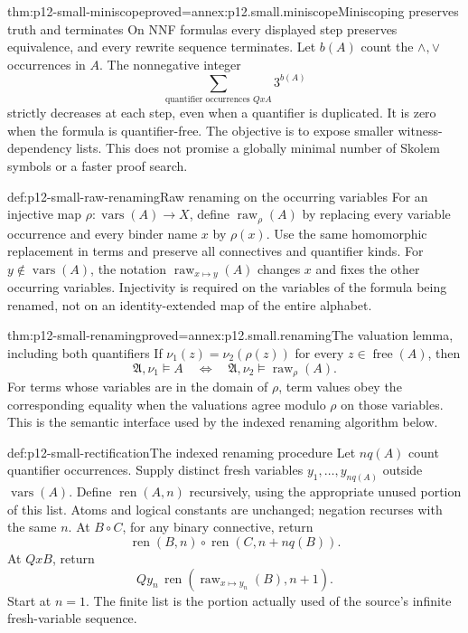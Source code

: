 \begin{hbtheorem}{thm:p12-small-miniscope}{proved=annex:p12.small.miniscope}{Miniscoping preserves truth and terminates}
On NNF formulas every displayed step preserves equivalence, and
every rewrite sequence terminates. Let \(b(A)\) count the
\(\land,\lor\) occurrences in \(A\). The nonnegative integer
\[
          \sum_{\text{quantifier occurrences }Qx A}3^{b(A)}
\]
strictly decreases at each step, even when a quantifier is duplicated.
It is zero when the formula is quantifier-free.
The objective is to expose smaller witness-dependency lists.
This does not promise a globally minimal number of Skolem symbols
or a faster proof search.
\end{hbtheorem}

\begin{hbdefinition}{def:p12-small-raw-renaming}{Raw renaming on the occurring variables}
For an injective map
\(\rho:\operatorname{vars}(A)\to X\), define
\(\operatorname{raw}_\rho(A)\) by replacing every variable
occurrence and every binder name \(x\) by \(\rho(x)\).
Use the same homomorphic replacement in terms and preserve
all connectives and quantifier kinds.
For \(y\notin\operatorname{vars}(A)\), the notation
\(\operatorname{raw}_{x\mapsto y}(A)\) changes \(x\) and
fixes the other occurring variables.
Injectivity is required on the variables of the formula being
renamed, not on an identity-extended map of the entire alphabet.
\end{hbdefinition}

\begin{hblemma}{thm:p12-small-renaming}{proved=annex:p12.small.renaming}{The valuation lemma, including both quantifiers}
If \(\nu_1(z)=\nu_2(\rho(z))\) for every
\(z\in\operatorname{free}(A)\), then
\[
       \mathfrak A,\nu_1\models A
       \quad\Longleftrightarrow\quad
       \mathfrak A,\nu_2\models\operatorname{raw}_\rho(A).
\]
For terms whose variables are in the domain of \(\rho\), term values
obey the corresponding equality when the valuations agree modulo
\(\rho\) on those variables. This is the semantic interface used
by the indexed renaming algorithm below.
\end{hblemma}

\begin{hbmethod}{def:p12-small-rectification}{The indexed renaming procedure}
Let \(nq(A)\) count quantifier occurrences. Supply distinct fresh
variables \(y_1,\ldots,y_{nq(A)}\) outside
\(\operatorname{vars}(A)\). Define \(\operatorname{ren}(A,n)\)
recursively, using the appropriate unused portion of this list.
Atoms and logical constants are unchanged; negation recurses
with the same \(n\). At \(B\circ C\), for any binary connective,
return
\[
       \operatorname{ren}(B,n)\circ
       \operatorname{ren}(C,n+nq(B)).
\]
At \(Qx B\), return
\[
          Qy_n\,\operatorname{ren}
                    (\operatorname{raw}_{x\mapsto y_n}(B),n+1).
\]
Start at \(n=1\). The finite list is the portion actually used
of the source's infinite fresh-variable sequence.
\end{hbmethod}

